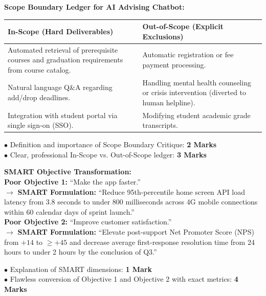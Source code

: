 \begin{solutionbox}
\textbf{Scope Boundary Ledger for AI Advising Chatbot:}\\
\begin{tabularx}{\linewidth}{|X|X|} \hline
\textbf{In-Scope (Hard Deliverables)} & \textbf{Out-of-Scope (Explicit Exclusions)} \\ \hline
Automated retrieval of prerequisite courses and graduation requirements from course catalog. & Automatic registration or fee payment processing. \\ \hline
Natural language Q\&A regarding add/drop deadlines. & Handling mental health counseling or crisis intervention (diverted to human helpline). \\ \hline
Integration with student portal via single sign-on (SSO). & Modifying student academic grade transcripts. \\ \hline
\end{tabularx}
\begin{markingrubric}
$\bullet$ Definition and importance of Scope Boundary Critique: \textbf{2 Marks}\\
$\bullet$ Clear, professional In-Scope vs. Out-of-Scope ledger: \textbf{3 Marks}
\end{markingrubric}
\end{solutionbox}

\begin{solutionbox}
\textbf{SMART Objective Transformation:}\\
\textbf{Poor Objective 1:} ``Make the app faster.''\\
$\to$ \textbf{SMART Formulation:} ``Reduce 95th-percentile home screen API load latency from 3.8 seconds to under 800 milliseconds across 4G mobile connections within 60 calendar days of sprint launch.''\\
\textbf{Poor Objective 2:} ``Improve customer satisfaction.''\\
$\to$ \textbf{SMART Formulation:} ``Elevate post-support Net Promoter Score (NPS) from $+14$ to $\ge +45$ and decrease average first-response resolution time from 24 hours to under 2 hours by the conclusion of Q3.''
\begin{markingrubric}
$\bullet$ Explanation of SMART dimensions: \textbf{1 Mark}\\
$\bullet$ Flawless conversion of Objective 1 and Objective 2 with exact metrics: \textbf{4 Marks}
\end{markingrubric}
\end{solutionbox}
